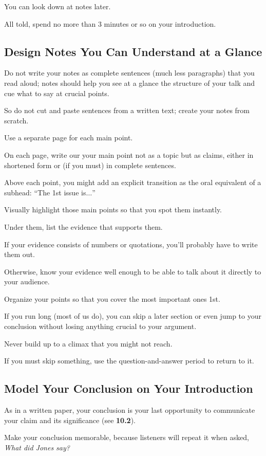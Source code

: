 \documentclass[oneside]{book}
\numberwithin{equation}{section}
\begin{document}
You can look down at notes later.

%
All told, spend no more than 3 minutes or so on your introduction.

\subsection{Design Notes You Can Understand at a Glance}
Do not write your notes as complete sentences (much less paragraphs) that you read aloud; notes should help you see at a glance the structure of your talk and cue what to say at crucial points.

So do not cut and paste sentences from a written text; create your notes from scratch.

%
Use a separate page for each main point.

On each page, write our your main point not as a topic but as claims, either in shortened form or (if you must) in complete sentences.

Above each point, you might add an explicit transition as the oral equivalent of a subhead: ``The 1st issue is$\ldots$''

%
Visually highlight those main points so that you spot them instantly.

Under them, list the evidence that supports them.

If your evidence consists of numbers or quotations, you'll probably have to write them out.

%
Otherwise, know your evidence well enough to be able to talk about it directly to your audience.

%
Organize your points so that you cover the most important ones 1st.

If you run long (most of us do), you can skip a later section or even jump to your conclusion without losing anything crucial to your argument.

Never build up to a climax that you might not reach.

If you must skip something, use the question-and-answer period to return to it.

\subsection{Model Your Conclusion on Your Introduction}
As in a written paper, your conclusion is your last opportunity to communicate your claim and its significance (see \textbf{10.2}).

Make your conclusion memorable, because listeners will repeat it when asked, \textit{What did Jones say?}
\end{document}
